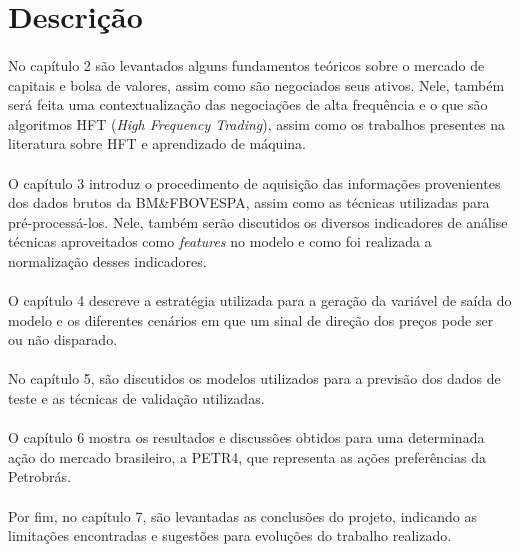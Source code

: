 \documentclass[grad,numbers]{coppe}
\begin{document}
  \section{Descrição}
  
    \paragraph{}No capítulo 2 são levantados alguns fundamentos teóricos sobre o mercado de capitais e bolsa de valores, assim como são negociados seus ativos. Nele, também será feita uma contextualização das negociações de alta frequência e o que são algoritmos HFT (\textit{High Frequency Trading}), assim como os trabalhos presentes na literatura sobre HFT e aprendizado de máquina.
    
    \paragraph{}O capítulo 3 introduz o procedimento de aquisição das informações provenientes dos dados brutos da BM\&FBOVESPA, assim como as técnicas utilizadas para pré-processá-los. Nele, também serão discutidos os diversos indicadores de análise técnicas aproveitados como \textit{features} no modelo e como foi realizada a normalização desses indicadores.
    
    \paragraph{}O capítulo 4 descreve a estratégia utilizada para a geração da variável de saída do modelo e os diferentes cenários em que um sinal de direção dos preços pode ser ou não disparado.
    
    \paragraph{}No capítulo 5, são discutidos os modelos utilizados para a previsão dos dados de teste e as técnicas de validação utilizadas.
    
    \paragraph{}O capítulo 6 mostra os resultados e discussões obtidos para uma determinada ação do mercado brasileiro, a PETR4, que representa as ações preferências da Petrobrás.
    
    \paragraph{}Por fim, no capítulo 7, são levantadas as conclusões do projeto, indicando as limitações encontradas e sugestões para evoluções do trabalho realizado.
  
\end{document}
